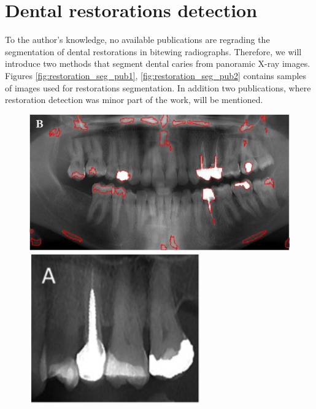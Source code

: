 \section{Dental restorations detection}
To the author's knowledge, no available publications are regrading the segmentation of dental restorations in bitewing radiographs. Therefore, we will introduce two methods that segment dental caries from panoramic X-ray images. Figures \ref{fig:restoration_seg_pub1}, \ref{fig:restoration_seg_pub2} contains samples of images used for restorations segmentation.
In addition two publications, where restoration detection was minor part of the work, will be mentioned.
\begin{figure}
    \begin{floatrow}[2]
        {\includegraphics[width=\linewidth]{images/segmentation_opg.png}}\;
        {\includegraphics[width=\linewidth]{images/segmentation_crop.png}}
    \end{floatrow}
\end{figure}
